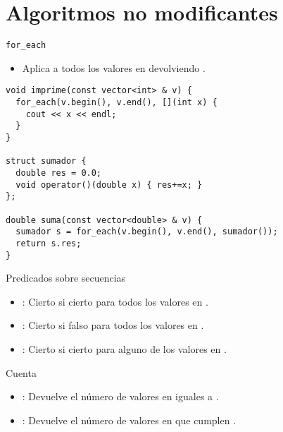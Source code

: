 \section{Algoritmos no modificantes}

\begin{frame}[t,fragile]{\texttt{for\_each}}
\begin{itemize}
  \item {} 
        Aplica  a todos los valores en \cppid{[i,f)} devolviendo .
\end{itemize}
\vfill\pause
\begin{lstlisting}
void imprime(const vector<int> & v) {
  for_each(v.begin(), v.end(), [](int x) {
    cout << x << endl;
  }
}

struct sumador {
  double res = 0.0;
  void operator()(double x) { res+=x; }
};

double suma(const vector<double> & v) {
  sumador s = for_each(v.begin(), v.end(), sumador());
  return s.res;
}
\end{lstlisting}
\end{frame}

\begin{frame}[t,fragile]{Predicados sobre secuencias}
\begin{itemize}
  \item {}: Cierto si  cierto para todos los valores en \cppid{[i,f)}.
  \item {}: Cierto si  falso para todos los valores en \cppid{[i,f)}.
  \item {}: Cierto si  cierto para alguno de los valores en \cppid{[i,f)}.
\end{itemize}
\end{frame}

\begin{frame}[t,fragile]{Cuenta}
\begin{itemize}
  \item {}: Devuelve el número de valores en \cppid{[i,f)} iguales a .
  \item {}: Devuelve el número de valores en \cppid{[i,f)} que cumplen .
\end{itemize}
\end{frame}

